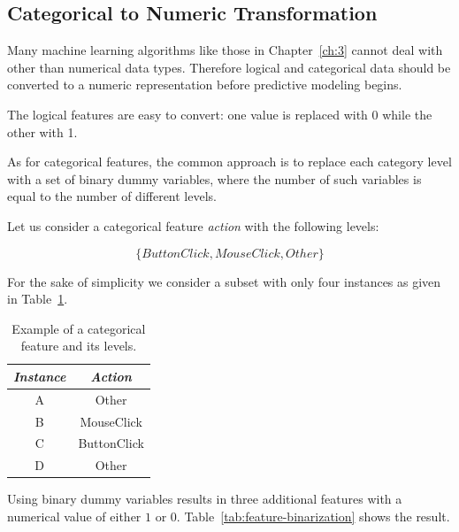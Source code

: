 \subsection{Categorical to Numeric Transformation}
\label{Ch:2:CTNT}
Many machine learning algorithms like those in Chapter~\ref{ch:3} cannot deal with other than numerical data types. Therefore logical and categorical data should be converted to a numeric representation before predictive modeling begins. 

The logical features are easy to convert: one value is replaced with 0 while the other with 1.

As for categorical features, the common approach is to replace each category level with a set of binary dummy variables, where the number of such variables is equal to the number of different levels.

Let us consider a categorical feature \textit{action} with the following levels: 

\[ \{ButtonClick, MouseClick, Other\} \]

For the sake of simplicity we consider a subset with only four instances as given in Table~\ref{tab:feature-categorical-rep}. 
\begin{table}[h!]
  \begin{center}
    \caption{Example of a categorical feature and its levels.}
    \label{tab:feature-categorical-rep}
    \begin{tabular}{|c|c|}\hline
    \textit{Instance} & \textit{Action} \\
      \hline
     A & Other \\ 
     \hline 
       B & MouseClick \\ 
     \hline
       C & ButtonClick \\ 
     \hline
       D & Other \\ 
     \hline
    \end{tabular}
  \end{center}
\end{table}

Using binary dummy variables results in three additional features with a numerical value of either \(1\) or \(0\). Table~\ref{tab:feature-binarization} shows the result.

\clearpage


